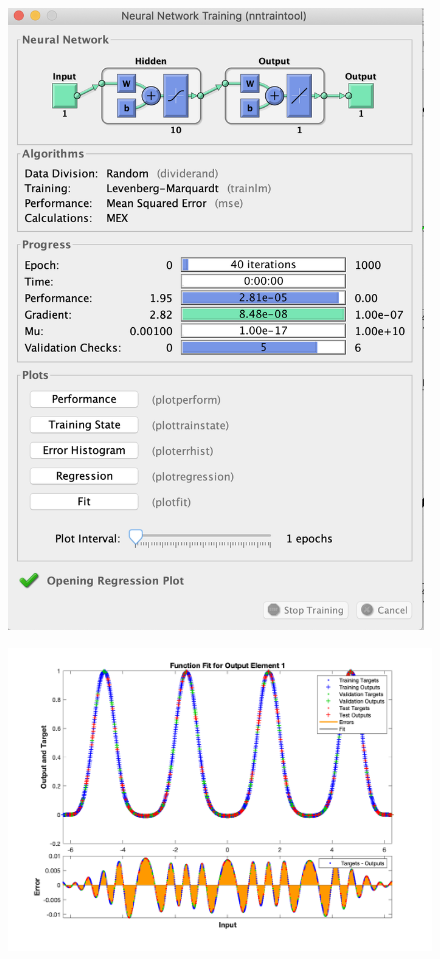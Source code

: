 \documentclass[12pt]{article}
\begin{document}
\begin{figure}[h]
	\includegraphics[width=11cm]{Main.png}
\end{figure}

\begin{figure}[h]
	\includegraphics[width=20cm]{Graph.png}
\end{figure}
\end{document}
